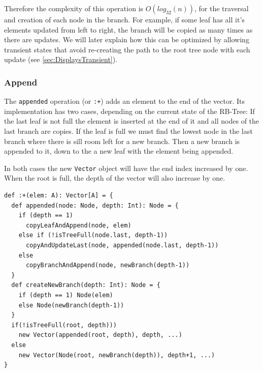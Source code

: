 Therefore the complexity of this operation is $O(log_{32}(n))$, for the traversal and creation of each node in the branch. For example, if some leaf has all it's elements updated from left to right, the branch will be copied as many times as there are updates. We will later explain how this can be optimized by allowing transient states that avoid re-creating the path to the root tree node with each update (see \ref{sec:DisplaysTransient}).


\subsubsection{Append}
The \texttt{appended} operation  (or \texttt{:+}) adds an element to the end of the vector. Its implementation has two cases, depending on the current state of the RB-Tree: If the last leaf is not full the element is inserted at the end of it and all nodes of the last branch are copies. If the leaf is full we must find the lowest node in the last branch where there is sill room left for a new branch. Then a new branch is appended to it, down to the a new leaf with the element being appended. 

In both cases the new \texttt{Vector} object will have the end index increased by one. When the root is full, the depth of the vector will also increase by one.

\begin{lstlisting}[frame=single]
def :+(elem: A): Vector[A] = {
  def appended(node: Node, depth: Int): Node = {
    if (depth == 1) 
      copyLeafAndAppend(node, elem)
    else if (!isTreeFull(node.last, depth-1)) 
      copyAndUpdateLast(node, appended(node.last, depth-1))
    else
      copyBranchAndAppend(node, newBranch(depth-1))
  }
  def createNewBranch(depth: Int): Node = {
    if (depth == 1) Node(elem)
    else Node(newBranch(depth-1))
  }
  if(!isTreeFull(root, depth))) 
    new Vector(appended(root, depth), depth, ...)
  else 
    new Vector(Node(root, newBranch(depth)), depth+1, ...)
}
\end{lstlisting}

